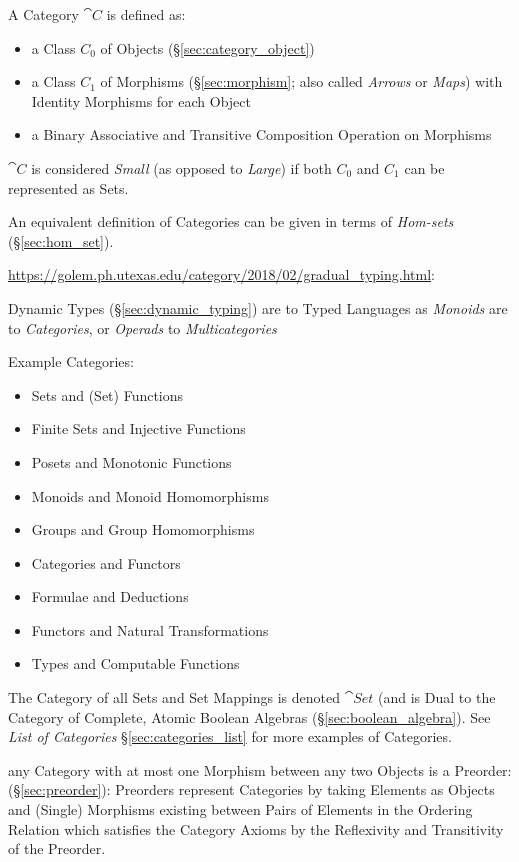 A Category $\cat{C}$ is defined as:
\begin{itemize}
\item a Class $C_0$ of Objects (\S\ref{sec:category_object})
\item a Class $C_1$ of Morphisms (\S\ref{sec:morphism}; also called
  \emph{Arrows} or \emph{Maps}) with Identity Morphisms for each
  Object
\item a Binary Associative and Transitive Composition Operation on
  Morphisms
\end{itemize}
$\cat{C}$ is considered \emph{Small} (as opposed to \emph{Large})
if both $C_0$ and $C_1$ can be represented as Sets.

An equivalent definition of Categories can be given in terms of
\emph{Hom-sets} (\S\ref{sec:hom_set}).

\url{https://golem.ph.utexas.edu/category/2018/02/gradual_typing.html}:

Dynamic Types (\S\ref{sec:dynamic_typing}) are to Typed Languages as
\emph{Monoids} are to \emph{Categories}, or \emph{Operads} to
\emph{Multicategories}

\asterism

Example Categories:
\begin{itemize}
\item Sets and (Set) Functions
\item Finite Sets and Injective Functions
\item Posets and Monotonic Functions
\item Monoids and Monoid Homomorphisms
\item Groups and Group Homomorphisms
\item Categories and Functors
\item Formulae and Deductions
\item Functors and Natural Transformations
\item Types and Computable Functions
\end{itemize}
The Category of all Sets and Set Mappings is denoted $\cat{Set}$
(and is Dual to the Category of Complete, Atomic Boolean Algebras
(\S\ref{sec:boolean_algebra}). See \emph{List of Categories}
\S\ref{sec:categories_list} for more examples of Categories.

any Category with at most one Morphism between any two Objects is a Preorder:
(\S\ref{sec:preorder}): Preorders represent Categories by taking Elements as
Objects and (Single) Morphisms existing between Pairs of Elements in the
Ordering Relation which satisfies the Category Axioms by the Reflexivity and
Transitivity of the Preorder.

